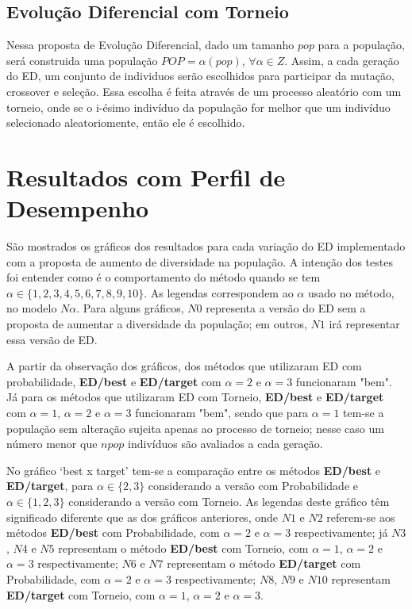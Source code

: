 \documentclass[12pt]{article}
\begin{document}
\subsection*{Evolução Diferencial com Torneio}
Nessa proposta de Evolução Diferencial, dado um tamanho $pop$ para a população, será construida uma população $POP = \alpha (pop)$, $\forall \alpha \in Z$. Assim, a cada geração do ED, um conjunto de  individuos serão escolhidos para participar da mutação, crossover e seleção. Essa escolha é feita através de um processo aleatório com um torneio, onde se o i-ésimo indivíduo da população for melhor que um indivíduo selecionado aleatoriomente, então ele é escolhido.
\section*{Resultados com Perfil de Desempenho}
São mostrados os gráficos dos resultados para cada variação do ED implementado com a proposta de aumento de diversidade na população. A intenção dos testes foi entender como é o comportamento do método quando se tem $\alpha \in \{1,2,3,4,5,6,7,8,9,10\}$. As legendas correspondem ao $\alpha$ usado no método, no modelo $N\alpha$. Para alguns gráficos, $N0$ representa a versão do ED sem a proposta de aumentar a diversidade da população; em outros, $N1$ irá representar essa versão de ED.

A partir da observação dos gráficos, dos métodos que utilizaram ED com probabilidade, \textbf{ED/best} e \textbf{ED/target} com $\alpha=2$ e $\alpha=3$ funcionaram "bem". Já para os métodos que utilizaram ED com Torneio, \textbf{ED/best} e \textbf{ED/target} com $\alpha=1$, $\alpha=2$ e $\alpha=3$ funcionaram "bem", sendo que para $\alpha=1$ tem-se a população sem alteração sujeita apenas ao processo de torneio; nesse caso um número menor que $npop$ indivíduos são avaliados a cada geração. 

No gráfico `best x target' tem-se a comparação entre os métodos \textbf{ED/best} e \textbf{ED/target}, para $\alpha \in \{2,3\}$ considerando a versão com Probabilidade e $\alpha \in \{1,2,3\}$ considerando a versão com Torneio. As legendas deste gráfico têm significado diferente que as dos gráficos anteriores, onde $N1$ e $N2$ referem-se aos métodos \textbf{ED/best} com Probabilidade, com $\alpha = 2$ e $\alpha = 3$ respectivamente; já $N3$, $N4$ e $N5$ representam o método \textbf{ED/best} com Torneio, com $\alpha = 1$, $\alpha = 2$ e $\alpha = 3$ respectivamente; $N6$ e $N7$ representam o método \textbf{ED/target} com Probabilidade, com $\alpha = 2$ e $\alpha = 3$ respectivamente; $N8$, $N9$ e $N10$ representam \textbf{ED/target} com Torneio, com $\alpha = 1$, $\alpha = 2$ e $\alpha = 3$.
\end{document}
